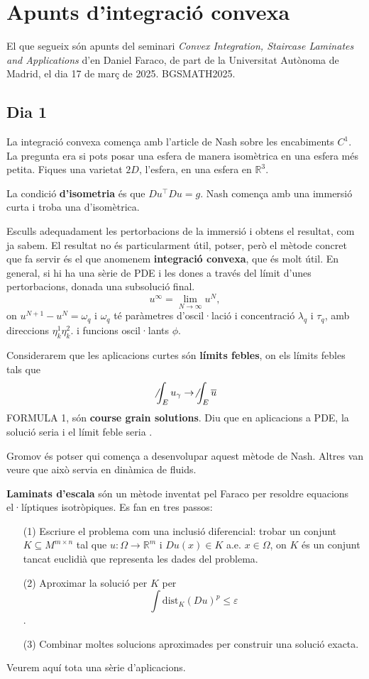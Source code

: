 \chapter{Apunts d'integració convexa}
El que segueix són apunts del seminari \textit{Convex Integration, Staircase Laminates and Applications} d'en Daniel Faraco, de part de la Universitat Autònoma de Madrid, el dia 17 de març de 2025. BGSMATH2025.

\section{Dia 1}
La integració convexa comença amb l'article de Nash sobre les encabiments $C^1$. La pregunta era si pots posar una esfera de manera isomètrica en una esfera més petita. Fiques una varietat $2D$, l'esfera, en una esfera en $\mathbb R^3$. 

La condició \textbf{d'isometria} és que $Du^\intercal Du = g$. Nash comença amb una immersió curta i troba una d'isomètrica. 

Esculls adequadament les pertorbacions de la immersió i obtens el resultat, com ja sabem. El resultat no és particularment útil, potser, però el mètode concret que fa servir és el que anomenem \textbf{integració convexa}, que és molt útil. En general, si hi ha una sèrie de PDE i les dones a través del límit d'unes pertorbacions, donada una subsolució final. 
$$u^\infty = \lim_{N\to\infty} u^N,$$
on $u^{N+1} - u^N = \omega_q$ i $\omega_q$ té paràmetres d'oscil·lació i concentració $\lambda_q$ i $\tau_q$, amb direccions $\eta_k^1\eta_k^2$. i funcions oscil·lants $\phi$.

Considerarem que les aplicacions curtes són \textbf{límits febles}, on els límits febles tals que 
$$\not\int_E u_\gamma \to \not\int_E \overline u$$
FORMULA 1, són \textbf{course grain solutions}. Diu que en aplicacions a PDE, la solució seria  i el límit feble seria .

Gromov és potser qui comença a desenvolupar aquest mètode de Nash. Altres van veure que això servia en dinàmica de fluids. 

\textbf{Laminats d'escala} són un mètode inventat pel Faraco per resoldre equacions el·líptiques isotròpiques. Es fan en tres passos:
\begin{itemize}
    \item[(1)] Escriure el problema com una inclusió diferencial: trobar un conjunt $K\subseteq M^{m\times n}$ tal que $u:\Omega\to\mathbb R^m$ i $Du(x)\in K$ a.e. $x\in\Omega$, on $K$ és un conjunt tancat euclidià que representa les dades del problema.
    \item[(2)] Aproximar la solució per $K$ per $$\int\text{dist}_K(Du)^p\le\varepsilon$$.
    \item[(3)] Combinar moltes solucions aproximades per construir una solució exacta.
\end{itemize}
Veurem aquí tota una sèrie d'aplicacions.

